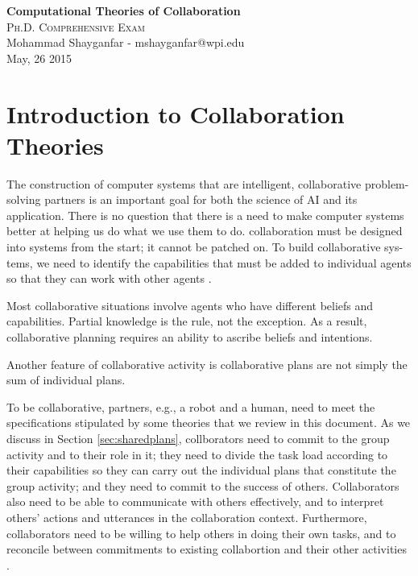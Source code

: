\documentclass[11pt]{article}
\begin{document}

\begin{center}
{\LARGE{\textbf{Computational Theories of Collaboration}}} \\
\Large\textsc{Ph.D. Comprehensive Exam} \\[1em]
\large\textnormal{Mohammad Shayganfar - mshayganfar@wpi.edu} \\
\large\textnormal{May, 26 2015}
\end{center}

\section{Introduction to Collaboration Theories}

The construction of computer systems that are intelligent, collaborative
problem-solving partners is an important goal for both the science of AI and its
application. There is no question that there is a need to make computer systems
better at helping us do what we use them to do. collaboration must be designed
into systems from the start; it cannot be patched on. To build collaborative sys-
tems, we need to identify the capabilities that must be added to individual
agents so that they can work with other agents
\cite{grosz:collaborative-systems}.

Most collaborative situations involve agents who have different beliefs and
capabilities. Partial knowledge is the rule, not the exception. As a result,
collaborative planning requires an ability to ascribe beliefs and intentions.

Another feature of collaborative activity is collaborative plans are not simply
the sum of individual plans.

To be collaborative, partners, e.g., a robot and a human, need to meet the
specifications stipulated by some theories that we review in this document. As
we discuss in Section \ref{sec:sharedplans}, collborators need to commit to the
group activity and to their role in it; they need to divide the task load
according to their capabilities so they can carry out the individual plans that
constitute the group activity; and they need to commit to the success of others.
Collaborators also need to be able to communicate with others effectively, and
to interpret others' actions and utterances in the collaboration context.
Furthermore, collaborators need to be willing to help others in doing their own
tasks, and to reconcile between commitments to existing collabortion and their
other activities \cite{grosz:mice-menus}.
\end{document}
